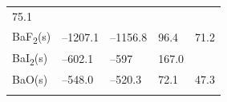 \documentclass[
  9pt,
]{extbook}
\theoremstyle{definition}
\theoremstyle{definition}
\theoremstyle{definition}
\theoremstyle{remark}
\begin{document}
\begin{longtable}[]{@{}lllll@{}}
\begin{minipage}[t]{0.18\columnwidth}
75.1\strut
\end{minipage}\tabularnewline
\begin{minipage}[t]{0.10\columnwidth}\raggedright
BaF\textsubscript{2}(s)\strut
\end{minipage} & \begin{minipage}[t]{0.19\columnwidth}\raggedright
--1207.1\strut
\end{minipage} & \begin{minipage}[t]{0.20\columnwidth}\raggedright
--1156.8\strut
\end{minipage} & \begin{minipage}[t]{0.18\columnwidth}\raggedright
96.4\strut
\end{minipage} & \begin{minipage}[t]{0.18\columnwidth}\raggedright
71.2\strut
\end{minipage}\tabularnewline
\begin{minipage}[t]{0.10\columnwidth}\raggedright
BaI\textsubscript{2}(s)\strut
\end{minipage} & \begin{minipage}[t]{0.19\columnwidth}\raggedright
--602.1\strut
\end{minipage} & \begin{minipage}[t]{0.20\columnwidth}\raggedright
--597\strut
\end{minipage} & \begin{minipage}[t]{0.18\columnwidth}\raggedright
167.0\strut
\end{minipage} & \begin{minipage}[t]{0.18\columnwidth}\raggedright
\strut
\end{minipage}\tabularnewline
\begin{minipage}[t]{0.10\columnwidth}\raggedright
BaO(s)\strut
\end{minipage} & \begin{minipage}[t]{0.19\columnwidth}\raggedright
--548.0\strut
\end{minipage} & \begin{minipage}[t]{0.20\columnwidth}\raggedright
--520.3\strut
\end{minipage} & \begin{minipage}[t]{0.18\columnwidth}\raggedright
72.1\strut
\end{minipage} & \begin{minipage}[t]{0.18\columnwidth}\raggedright
47.3\strut
\end{minipage}\tabularnewline
\begin{minipage}[t]{0.10\columnwidth}\raggedright

\end{minipage}
\end{longtable}
\end{document}
